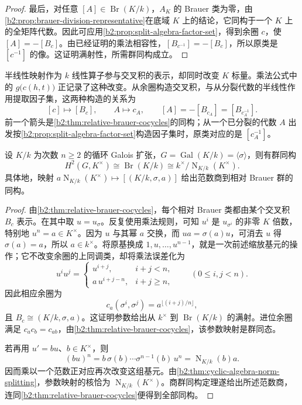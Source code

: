 \begin{proof}
	最后，对任意 \([A]\in\operatorname{Br}(K/k)\)，\(A_K\) 的 Brauer 类为零，由\cref{b2:prop:brauer-division-representative}在底域 \(K\) 上的结论，它同构于一个 \(K\) 上的全矩阵代数。因此可应用\cref{b2:prop:split-algebra-factor-set}，得到余圈 \(c\)，使 \([A]=-[B_c]\)。由已经证明的乘法相容性，\([B_{c^{-1}}]=-[B_c]\)，所以原类是 \([c^{-1}]\) 的像。这证明满射性，所需群同构成立。
\end{proof}

半线性映射作为 \(k\) 线性算子参与交叉积的表示，却同时改变 \(K\) 标量。乘法公式中的 \(g\bigl(c(h,t)\bigr)\) 正记录了这种改变。从余圈构造交叉积，与从分裂代数的半线性作用提取因子集，这两种构造的关系为
\[
	[c]\longmapsto[B_c],\qquad A\longmapsto c_A,\qquad [A]=-[B_{c_A}]=[B_{c_A^{-1}}].
\]
前一个箭头是\cref{b2:thm:relative-brauer-cocycles}的同构；从一个已分裂的代数 \(A\) 出发按\cref{b2:prop:split-algebra-factor-set}构造因子集时，原类对应的是 \([c_A^{-1}]\)。

\begin{corollary}[循环情形的范数商]\label{b2:cor:cyclic-relative-brauer}
	设 \(K/k\) 为次数 \(n\ge2\) 的循环 Galois 扩张，\(G=\operatorname{Gal}(K/k)=\langle\sigma\rangle\)，则有群同构
	\[
		H^2(G,K^\times)\cong\operatorname{Br}(K/k) \cong k^\times/\operatorname{N}_{K/k}(K^\times).
	\]
	具体地，映射 \(a\operatorname{N}_{K/k}(K^\times)\mapsto[(K/k,\sigma,a)]\) 给出范数商到相对 Brauer 群的同构。
\end{corollary}
\begin{proof}
	由\cref{b2:thm:relative-brauer-cocycles}，每个相对 Brauer 类都由某个交叉积 \(B_c\) 表示。在其中取 \(u=u_\sigma\)。反复使用乘法规则，可知 \(u^i\) 是 \(u_{\sigma^i}\) 的非零 \(K\) 倍数，特别地 \(u^n=a\in K^\times\)。因为 \(u\) 与其幂 \(a\) 交换，而 \(ua=\sigma(a)u\)，可消去 \(u\) 得 \(\sigma(a)=a\)，所以 \(a\in k^\times\)。将原基换成 \(1,u,\ldots,u^{n-1}\)，就是一次前述缩放基元的操作；它不改变余圈的上同调类，却将乘法误差化为
	\[
		u^i u^j=
		\begin{cases}
			u^{i+j},&i+j<n,\\
			a\,u^{i+j-n},&i+j\ge n,
		\end{cases}
		\qquad(0\le i,j<n).
	\]
	因此相应余圈为
	\[
		c_a(\sigma^i,\sigma^j)=a^{\lfloor(i+j)/n\rfloor},
	\]
	且 \(B_c\cong(K/k,\sigma,a)\)。这证明参数给出从 \(k^\times\) 到 \(\operatorname{Br}(K/k)\) 的满射。进位余圈满足 \(c_a c_b=c_{ab}\)，由\cref{b2:thm:relative-brauer-cocycles}，该参数映射是群同态。

	若再用 \(u'=bu\)、\(b\in K^\times\)，则
	\[
		(bu)^n=b\,\sigma(b)\cdots\sigma^{n-1}(b)\,u^n =\operatorname{N}_{K/k}(b)a.
	\]
	因而乘以一个范数正对应再次改变这组基元。由\cref{b2:thm:cyclic-algebra-norm-splitting}，参数映射的核恰为 \(\operatorname{N}_{K/k}(K^\times)\)。商群同构定理遂给出所述范数商，连同\cref{b2:thm:relative-brauer-cocycles}便得到全部同构。
\end{proof}

